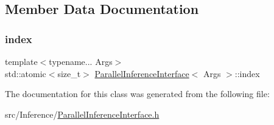 \subsection{Member Data Documentation}
\mbox{\label{class_parallel_inference_interface_a1494ba5ab10b5fda9bca6acc39de37cb}} 
\subsubsection{\texorpdfstring{index}{index}}
{\footnotesize\ttfamily template$<$typename... Args$>$ \\
std\+::atomic$<$size\+\_\+t$>$ \hyperlink{class_parallel_inference_interface}{Parallel\+Inference\+Interface}$<$ Args $>$\+::index}



The documentation for this class was generated from the following file\+:\begin{DoxyCompactItemize}
\item 
src/\+Inference/\hyperlink{_parallel_inference_interface_8h}{Parallel\+Inference\+Interface.\+h}\end{DoxyCompactItemize}
